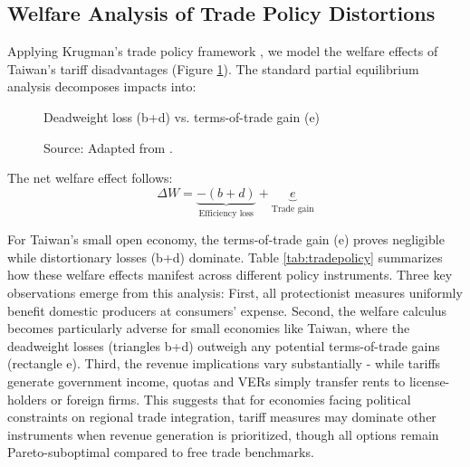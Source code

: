 \documentclass{article}
\begin{document}
\subsection{Welfare Analysis of Trade Policy Distortions}

Applying Krugman's trade policy framework \cite{krugman_obstfeld_international_economics}, we model the welfare effects of Taiwan's tariff disadvantages (Figure \ref{fig:krugman}). The standard partial equilibrium analysis decomposes impacts into:

\begin{figure}[h]
    \caption{Deadweight loss (b+d) vs. terms-of-trade gain (e)}
    \centering
    \caption*{Source: Adapted from \cite{krugman_obstfeld_international_economics}.}
    \label{fig:krugman}
\end{figure}



The net welfare effect follows:
\[
\Delta W = \underbrace{-(b + d)}_{\text{Efficiency loss}} + \underbrace{e}_{\text{Trade gain}}
\]

For Taiwan's small open economy, the terms-of-trade gain (e) proves negligible while distortionary losses (b+d) dominate. Table \ref{tab:tradepolicy} summarizes how these welfare effects manifest across different policy instruments. Three key observations emerge from this analysis: First, all protectionist measures uniformly benefit domestic producers at consumers' expense. Second, the welfare calculus becomes particularly adverse for small economies like Taiwan, where the deadweight losses (triangles b+d) outweigh any potential terms-of-trade gains (rectangle e). Third, the revenue implications vary substantially - while tariffs generate government income, quotas and VERs simply transfer rents to license-holders or foreign firms. This suggests that for economies facing political constraints on regional trade integration, tariff measures may dominate other instruments when revenue generation is prioritized, though all options remain Pareto-suboptimal compared to free trade benchmarks.
\end{document}
